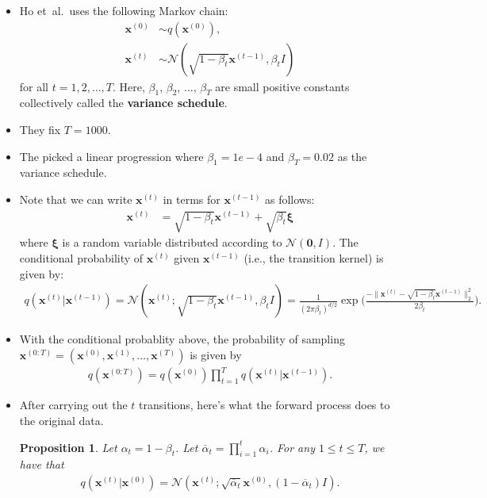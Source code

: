 \documentclass[10pt]{article}
\newtheorem{proposition}[lemma]{Proposition}
\newcommand{\ve}[1]{\mathbf{#1}}
\newcommand{\ves}[1]{\boldsymbol{#1}}
\newcommand{\etal}{{et~al.}}
\newcommand{\mcal}[1]{\mathcal{#1}}
\begin{document}
\begin{itemize}
  \item Ho \etal\ uses the following Markov chain:
  \begin{align*}
    \ve{x}^{(0)} &\sim q(\ve{x}^{(0)}),\\
    \ve{x}^{(t)} &\sim \mcal{N}(\sqrt{1 - \beta_t} \ve{x}^{(t-1)}, \beta_t I)
  \end{align*}
  for all $t = 1, 2, \dotsc, T$. Here, $\beta_1$, $\beta_2$, $\dotsc$, $\beta_T$ are small positive constants collectively called the {\bf variance schedule}.

  \item They fix $T = 1000$.
  
  \item The picked a linear progression where $\beta_1 = 1e-4$ and $\beta_T = 0.02$ as the variance schedule.
  
  \item Note that we can write $\ve{x}^{(t)}$ in terms for $\ve{x}^{(t-1)}$ as follows:
  \begin{align*}
    \ve{x}^{(t)} &= \sqrt{1 - \beta_t} \ve{x}^{(t-1)} + \sqrt{\beta_t} \ves{\xi}
  \end{align*}
  where $\ves{\xi}$ is a random variable distributed according to $\mcal{N}(\ve{0},I)$. The conditional probability of $\ve{x}^{(t)}$ given $\ve{x}^{(t-1)}$ (i.e., the transition kernel) is given by:
  \begin{align*}
    q(\ve{x}^{(t)} | \ve{x}^{(t-1)}) = \mcal{N}(\ve{x}^{(t)}; \sqrt{1 - \beta_t} \ve{x}^{(t-1)}, \beta_t I) = \frac{1}{(2\pi \beta_t)^{d/2}}\exp\bigg( \frac{-\| \ve{x}^{(t)} - \sqrt{1 - \beta_t} \ve{x}^{(t-1)} \|_2^2}{2\beta_t} \bigg).
  \end{align*}

  \item With the conditional probablity above, the probability of sampling $\ve{x}^{(0:T)} = (\ve{x}^{(0)}, \ve{x}^{(1)}, \dotsc, \ve{x}^{(T)})$ is given by
  \begin{align*}
    q(\ve{x}^{(0:T)}) = q(\ve{x}^{(0)}) \prod_{t=1}^T q(\ve{x}^{(t)}|\ve{x}^{(t-1)}).
  \end{align*}

  \item After carrying out the $t$ transitions, here's what the forward process does to the original data.
  \begin{proposition}
    Let $\alpha_t = 1 - \beta_t$. Let $\overline{\alpha}_t = \prod_{i=1}^t \alpha_i$. For any $1 \leq t \leq T$, we have that 
    \begin{align*}
      q(\ve{x}^{(t)}|\ve{x}^{(0)}) = \mcal{N}(\ve{x}^{(t)}; \sqrt{\overline{\alpha}_t} \ve{x}^{(0)}, (1 - \overline{\alpha}_t) I ).
    \end{align*}
  \end{proposition}


\end{itemize}
\end{document}
